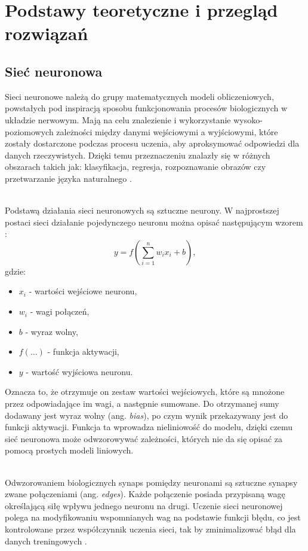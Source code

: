 \section{Podstawy teoretyczne i przegląd rozwiązań}
\subsection{Sieć neuronowa}
Sieci neuronowe należą do grupy
matematycznych modeli obliczeniowych,
powstałych pod inspiracją sposobu funkcjonowania
procesów biologicznych w układzie nerwowym.
Mają na celu znalezienie i wykorzystanie
wysoko-poziomowych zależności
między danymi wejściowymi a wyjściowymi,
które zostały dostarczone podczas procesu uczenia,
aby aproksymować odpowiedzi dla danych rzeczywistych.
Dzięki temu przeznaczeniu znalazły się
w różnych obszarach takich jak:
klasyfikacja,
regresja, rozpoznawanie obrazów czy
przetwarzanie języka naturalnego%
.

\noindent\\
Podstawą działania sieci neuronowych
są sztuczne neurony.
W najprostszej postaci sieci działanie
pojedynczego neuronu można
opisać następującym wzorem%
:
$$
  y=f\left(
    \sum_{i=1}^{n}{w_i x_i}
    +b
  \right),
$$
gdzie:
\begin{itemize}
  \item $x_i$ - wartości wejściowe neuronu,
  \item $w_i$ - wagi połączeń,
  \item $b$ - wyraz wolny,
  \item $f\left(\dots\right)$ - funkcja aktywacji,
  \item $y$ - wartość wyjściowa neuronu.
\end{itemize}
Oznacza to, że otrzymuje on zestaw wartości wejściowych,
które są mnożone przez odpowiadające im wagi,
a następnie sumowane.
Do otrzymanej sumy dodawany
jest wyraz wolny (ang. \textit{bias}),
po czym wynik przekazywany jest
do funkcji aktywacji.
Funkcja ta wprowadza nieliniowość do modelu,
dzięki czemu sieć neuronowa
może odwzorowywać zależności,
których nie da się opisać
za pomocą prostych modeli liniowych.

\noindent\\
Odwzorowaniem biologicznych synaps pomiędzy
neuronami są sztuczne synapsy
zwane połączeniami (ang. \textit{edges}).
Każde połączenie posiada przypisaną wagę
określającą siłę wpływu jednego neuronu na drugi.
Uczenie sieci neuronowej polega
na modyfikowaniu wspomnianych wag
na podstawie funkcji błędu,
co jest kontrolowane przez
współczynnik uczenia sieci,
tak by zminimalizować błąd
dla danych treningowych%
.

